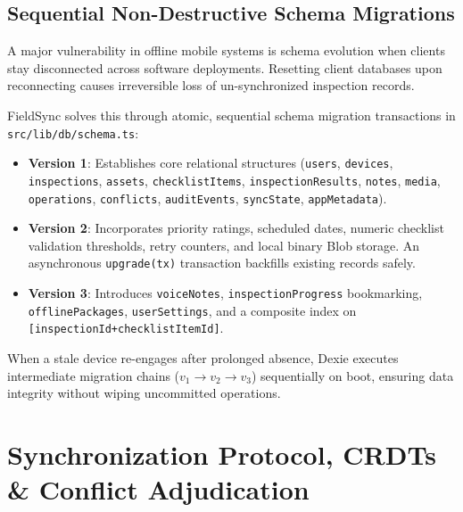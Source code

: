 \documentclass[conference]{IEEEtran}
\begin{document}
\subsection{Sequential Non-Destructive Schema Migrations}
A major vulnerability in offline mobile systems is schema evolution when clients stay disconnected across software deployments. Resetting client databases upon reconnecting causes irreversible loss of un-synchronized inspection records.

FieldSync solves this through atomic, sequential schema migration transactions in \texttt{src/lib/db/schema.ts}:
\begin{itemize}\setlength{\itemsep}{1pt}
    \item \textbf{Version 1}: Establishes core relational structures (\texttt{users}, \texttt{devices}, \texttt{inspections}, \texttt{assets}, \texttt{checklistItems}, \texttt{inspectionResults}, \texttt{notes}, \texttt{media}, \texttt{operations}, \texttt{conflicts}, \texttt{auditEvents}, \texttt{syncState}, \texttt{appMetadata}).
    \item \textbf{Version 2}: Incorporates priority ratings, scheduled dates, numeric checklist validation thresholds, retry counters, and local binary Blob storage. An asynchronous \texttt{upgrade(tx)} transaction backfills existing records safely.
    \item \textbf{Version 3}: Introduces \texttt{voiceNotes}, \texttt{inspectionProgress} bookmarking, \texttt{offlinePackages}, \texttt{userSettings}, and a composite index on \texttt{[inspectionId+checklistItemId]}.
\end{itemize}
When a stale device re-engages after prolonged absence, Dexie executes intermediate migration chains ($v_1 \rightarrow v_2 \rightarrow v_3$) sequentially on boot, ensuring data integrity without wiping uncommitted operations.

\section{Synchronization Protocol, CRDTs \& Conflict Adjudication}
\end{document}
